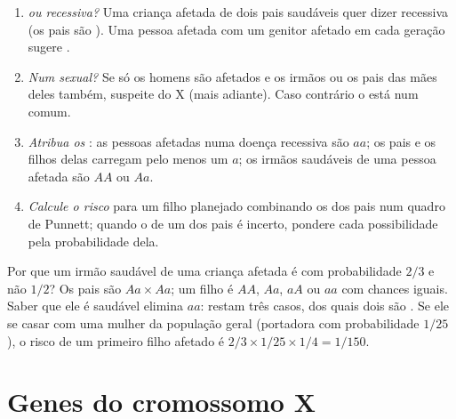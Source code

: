 \begin{method}\label{met:g11:genes-and-disease:analyse}
\begin{enumerate}
  \item \emph{ ou recessiva?} Uma criança afetada de dois
        pais saudáveis quer dizer recessiva (os pais são ).
        Uma pessoa afetada com um genitor afetado em cada geração
        sugere .
  \item \emph{Num  sexual?} Se só os homens são afetados e
        os irmãos ou os pais das mães deles também, suspeite do
         X (mais adiante). Caso contrário o  está num
         comum.
  \item \emph{Atribua os }: as pessoas afetadas numa doença
        recessiva são $aa$; os pais e os filhos delas carregam pelo
        menos um $a$; os irmãos saudáveis de uma pessoa afetada são
        $AA$ ou $Aa$.
  \item \emph{Calcule o risco} para um filho planejado combinando os
         dos pais num quadro de Punnett; quando o  de
        um dos pais é incerto, pondere cada possibilidade pela
        probabilidade dela.
\end{enumerate}
\end{method}

\begin{example}\label{ex:g11:genes-and-disease:twothirds}
Por que um irmão saudável de uma criança afetada é  com
probabilidade $2/3$ e não $1/2$? Os pais são $Aa \times Aa$; um filho é
$AA$, $Aa$, $aA$ ou $aa$ com chances iguais. Saber que ele é saudável
elimina $aa$: restam três casos, dos quais dois são . Se ele
se casar com uma mulher da população geral (portadora com probabilidade
$1/25$), o risco de um primeiro filho afetado é
$2/3 \times 1/25 \times 1/4 = 1/150$.
\end{example}

\section{Genes do cromossomo X}

